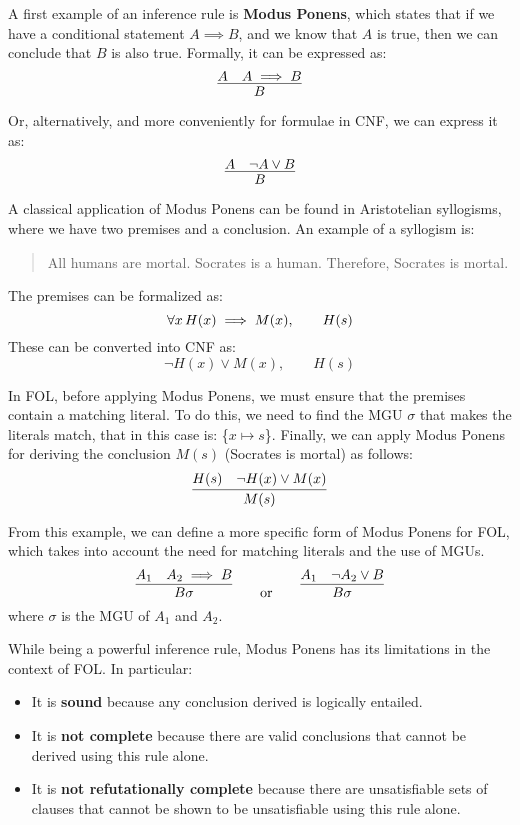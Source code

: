 A first example of an inference rule is \textbf{Modus Ponens}, which states that if we have a conditional statement \(A \implies B\), and we know that \(A\) is true, then we can conclude that \(B\) is also true. Formally, it can be expressed as:
\begin{equation}  
  \infer{B}{A & A \implies B}
\end{equation}


Or, alternatively, and more conveniently for formulae in CNF, we can express it as:
\begin{equation}  
  \infer{B}{A & \neg A \lor B}
\end{equation}

A classical application of Modus Ponens can be found in Aristotelian syllogisms, where we have two premises and a conclusion.
An example of a syllogism is:
\begin{quote}
  All humans are mortal. Socrates is a human. Therefore, Socrates is mortal.
\end{quote}
The premises can be formalized as:
\begin{equation}
  \forall x \, H(x) \implies M(x), \qquad H(s)
\end{equation}
These can be converted into CNF as:
\begin{equation}
    \neg H(x) \lor M(x), \qquad H(s)
\end{equation}

In FOL, before applying Modus Ponens, we must ensure that the premises contain a matching literal. To do this, we need to find the MGU \(\sigma\) that makes the literals match, that in this case is: \{\(x\mapsto s\)\}.
Finally, we can apply Modus Ponens for deriving the conclusion \(M(s)\) (Socrates is mortal) as follows:
\begin{equation}
  \infer{M(s)}{H(s) & \neg H(x) \lor M(x)}
\end{equation}

From this example, we can define a more specific form of Modus Ponens for FOL, which takes into account the need for matching literals and the use of MGUs.
\begin{equation}  
  \infer{B\sigma}{A_1 & A_2 \implies B} \qquad \text{or} \qquad \infer{B\sigma}{A_1 & \neg A_2 \lor B}
\end{equation}
where \(\sigma\) is the MGU of \(A_1\) and \(A_2\).

While being a powerful inference rule, Modus Ponens has its limitations in the context of FOL\@.
In particular:
\begin{itemize}
  \item It is \textbf{sound} because any conclusion derived is logically entailed.
  \item It is \textbf{not complete} because there are valid conclusions that cannot be derived using this rule alone.
  \item It is \textbf{not refutationally complete} because there are unsatisfiable sets of clauses that cannot be shown to be unsatisfiable using this rule alone.
\end{itemize}


